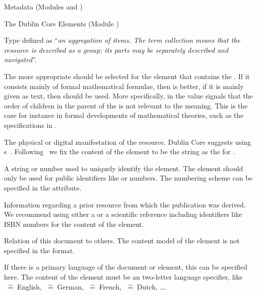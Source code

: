 \begin{tchapter}[id=metadata,short=Metadata]{Metadata (Modules {} and  {})}
\begin{tsection}[id=dc-elements]{The Dublin Core Elements (Module {})}
\begin{description}
\begin{description}
{{        Type}} defined as ``{\emph{an aggregation of items. The term collection means that
      the resource is described as a group; its parts may be separately described and
      navigated}}''.
  \end{description}
  The more appropriate should be selected for the element that contains the
  {}. If it consists mainly of formal mathematical formulae, then
  {} is better, if it is mainly given as text, then {}
  should be used. More specifically, in {\omdoc} the value {} signals
  that the order of children in the parent of the {} is not relevant to
  the meaning. This is the case for instance in formal developments of mathematical
  theories, such as the specifications in {}.
\item[{\element[ns-elt=dc]{format}}] The physical or digital manifestation of the
  resource.  Dublin Core suggests using {s}~\cite{FreBor:MIME96}.
  Following~\cite{MurLau:xmt01} we fix the content of the {}
  element to be the string {} as the {}
  for {\omdoc}.
\item[{\element[ns-elt=dc]{identifier}}] A string or number used to uniquely identify the
  element.  The {} element should only be used
  for public identifiers like {} or {} numbers. The
  numbering scheme can be specified in the {}
  attribute.
\item[{\element[ns-elt=dc]{source}}] Information regarding a prior resource from which the
  publication was derived. We recommend using either a {} or a scientific
  reference including identifiers like ISBN numbers for the content of the
  {} element.
\item[{\element[ns-elt=dc]{relation}}] Relation of this document to others.  The content
  model of the {} element is not specified in the {\omdoc}
  format.
\item[{\element[ns-elt=dc]{language}}] If there is a primary language of the document or
  element, this can be specified here. The content of the {}
  element must be an {} two-letter language specifier, like
  {}$\;\widehat=\;$English, {}$\;\widehat=\;$German,
  {}$\;\widehat=\;$French, {}$\;\widehat=\;$Dutch, \ldots.

\end{description}
\end{tsection}
\end{tchapter}
